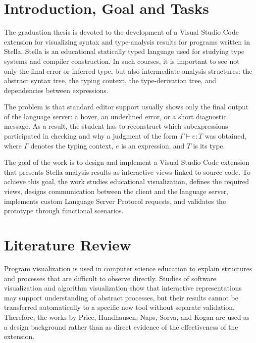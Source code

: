 ﻿\documentclass[14pt,a4paper]{extarticle}
\begin{document}

\setcounter{page}{2}

\section*{Introduction, Goal and Tasks}

The graduation thesis is devoted to the development of a Visual Studio Code extension for visualizing syntax and type-analysis results for programs written in Stella. Stella is an educational statically typed language used for studying type systems and compiler construction. In such courses, it is important to see not only the final error or inferred type, but also intermediate analysis structures: the abstract syntax tree, the typing context, the type-derivation tree, and dependencies between expressions.

The problem is that standard editor support usually shows only the final output of the language server: a hover, an underlined error, or a short diagnostic message. As a result, the student has to reconstruct which subexpressions participated in checking and why a judgment of the form $\Gamma \vdash e : T$ was obtained, where $\Gamma$ denotes the typing context, $e$ is an expression, and $T$ is its type.

The goal of the work is to design and implement a Visual Studio Code extension that presents Stella analysis results as interactive views linked to source code. To achieve this goal, the work studies educational visualization, defines the required views, designs communication between the client and the language server, implements custom Language Server Protocol requests, and validates the prototype through functional scenarios.

\section*{Literature Review}

Program visualization is used in computer science education to explain structures and processes that are difficult to observe directly. Studies of software visualization and algorithm visualization show that interactive representations may support understanding of abstract processes, but their results cannot be transferred automatically to a specific new tool without separate validation. Therefore, the works by Price, Hundhausen, Naps, Sorva, and Kogan are used as a design background rather than as direct evidence of the effectiveness of the extension.
\end{document}
